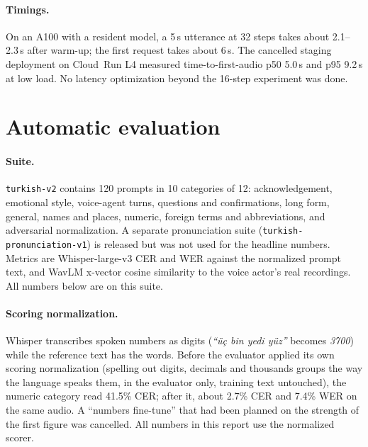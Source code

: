 \documentclass[10pt,twocolumn]{article}
\newcommand{\code}[1]{\texttt{#1}}
\begin{document}
\paragraph{Timings.} On an A100 with a resident model, a 5\,s utterance at 32 steps takes about 2.1--2.3\,s after warm-up; the first request takes about 6\,s. The cancelled staging deployment on Cloud~Run L4 measured time-to-first-audio p50 5.0\,s and p95 9.2\,s at low load. No latency optimization beyond the 16-step experiment was done.

\section{Automatic evaluation}
\label{sec:eval}

\paragraph{Suite.} \code{turkish-v2} contains 120 prompts in 10 categories of 12: acknowledgement, emotional style, voice-agent turns, questions and confirmations, long form, general, names and places, numeric, foreign terms and abbreviations, and adversarial normalization. A separate pronunciation suite (\code{turkish-pronunciation-v1}) is released but was not used for the headline numbers. Metrics are Whisper-large-v3 CER and WER against the normalized prompt text, and WavLM x-vector cosine similarity to the voice actor's real recordings. All numbers below are on this suite.

\paragraph{Scoring normalization.} Whisper transcribes spoken numbers as digits (\textit{``üç bin yedi yüz''} becomes \textit{3700}) while the reference text has the words. Before the evaluator applied its own scoring normalization (spelling out digits, decimals and thousands groups the way the language speaks them, in the evaluator only, training text untouched), the numeric category read 41.5\% CER; after it, about 2.7\% CER and 7.4\% WER on the same audio. A ``numbers fine-tune'' that had been planned on the strength of the first figure was cancelled. All numbers in this report use the normalized scorer.
\end{document}
